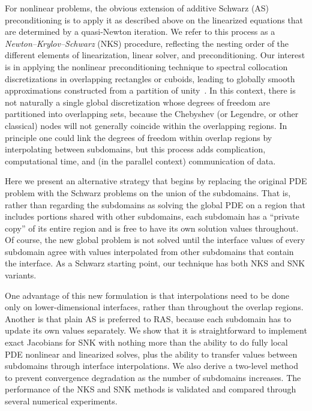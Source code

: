For nonlinear problems, the obvious extension of  additive Schwarz (AS) preconditioning is to apply it as described above on the linearized equations that are determined by a quasi-Newton iteration. We refer to this process as a \emph{Newton--Krylov--Schwarz} (NKS) procedure, reflecting the nesting order of the different elements of linearization, linear solver, and preconditioning. Our interest is in applying the nonlinear preconditioning technique to spectral collocation discretizations in overlapping rectangles or cuboids, leading to globally smooth approximations constructed from a partition of unity~\cite{AitonTA}. In this context, there is not naturally a single global discretization whose degrees of freedom are partitioned into overlapping sets, because the Chebyshev (or Legendre, or other classical) nodes will not generally coincide within the overlapping regions. In principle one could link the degrees of freedom within overlap regions by interpolating between subdomains, but this process adds complication, computational time, and (in the parallel context) communication of data.

Here we present an alternative strategy that begins by replacing the original PDE problem with the Schwarz problems on the union of the subdomains. That is, rather than regarding the subdomains as solving the global PDE on a region that includes portions shared with other subdomains, each subdomain has a ``private copy'' of its entire region and is free to have its own solution values throughout. Of course, the new global problem is not solved until the interface values of every subdomain agree with values interpolated from other subdomains that contain the interface. As a Schwarz starting point, our technique has both NKS and SNK variants. 

One advantage of this new formulation is that interpolations need to be done only on lower-dimensional interfaces, rather than throughout the overlap regions. Another is that plain AS is preferred to RAS, because each subdomain has to update its own values separately. We show that it is straightforward to implement exact Jacobians for SNK with nothing more than the ability to do fully local PDE nonlinear and linearized solves, plus the ability to transfer values between subdomains through interface interpolations. We also derive a two-level method to prevent convergence degradation as the number of subdomains increases. The performance of the NKS and SNK methods is validated and compared through several numerical experiments. 


